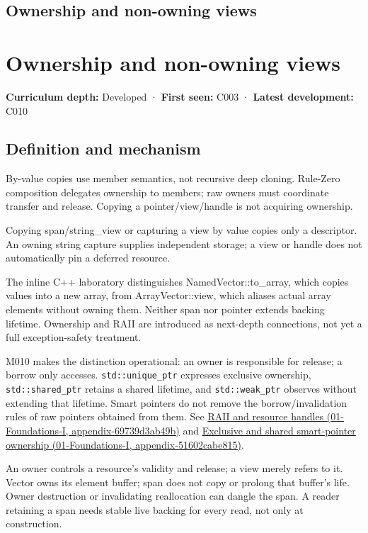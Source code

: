 \hypertarget{appendix-d52e4486f527}{}
\section*{Ownership and non-owning views}
\chapter{Ownership and non-owning views}\label{appendix-d52e4486f527-ownership-and-non-owning-views}

\textbf{Curriculum depth:} Developed · \textbf{First seen:} C003 · \textbf{Latest development:} C010

\section{Definition and mechanism}\label{appendix-d52e4486f527-definition-and-mechanism}

By-value copies use member semantics, not recursive deep cloning. Rule-Zero composition delegates ownership to members; raw owners must coordinate transfer and release. Copying a pointer/view/handle is not acquiring ownership.

Copying span/string\_view or capturing a view by value copies only a descriptor. An owning string capture supplies independent storage; a view or handle does not automatically pin a deferred resource.

The inline C++ laboratory distinguishes NamedVector::to\_array, which copies values into a new array, from ArrayVector::view, which aliases actual array elements without owning them. Neither span nor pointer extends backing lifetime. Ownership and RAII are introduced as next-depth connections, not yet a full exception-safety treatment.

M010 makes the distinction operational: an owner is responsible for release; a borrow only accesses. \texttt{std::unique\_ptr} expresses exclusive ownership, \texttt{std::shared\_ptr} retains a shared lifetime, and \texttt{std::weak\_ptr} observes without extending that lifetime. Smart pointers do not remove the borrow/invalidation rules of raw pointers obtained from them. See \href{../01-Foundations-I/main.pdf\#nameddest=appendix-69739d3ab49b}{RAII and resource handles (01-Foundations-I, appendix-69739d3ab49b)} and \href{../01-Foundations-I/main.pdf\#nameddest=appendix-51602cabe815}{Exclusive and shared smart-pointer ownership (01-Foundations-I, appendix-51602cabe815)}.

An owner controls a resource's validity and release; a view merely refers to it. Vector owns its element buffer; span does not copy or prolong that buffer's life. Owner destruction or invalidating reallocation can dangle the span. A reader retaining a span needs stable live backing for every read, not only at construction.

